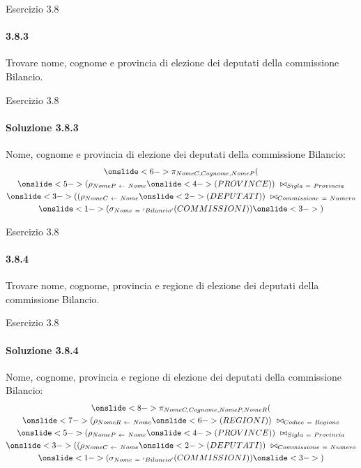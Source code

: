 %
\begin{frame}{Esercizio 3.8}
    \framesubtitle{3.8.3}
    Trovare nome, cognome e provincia di elezione dei deputati della commissione Bilancio.
\end{frame}
%
\begin{frame}{Esercizio 3.8}
    \framesubtitle{Soluzione 3.8.3}
    \vspace*{-1.2cm}
    {\small Nome, cognome e provincia di elezione dei deputati della commissione Bilancio:}
    \small
    \begin{gather*}
        \onslide<6->{\pi_{NomeC,Cognome,NomeP}(}\\
        \onslide<5->{(\rho_{NomeP~\leftarrow~Nome}}
        \onslide<4->{(PROVINCE))~\bowtie_{Sigla~=~Provincia}}\\
        \onslide<3->{((\rho_{NomeC~\leftarrow~Nome}}
        \onslide<2->{(DEPUTATI))~\bowtie_{Commissione~=~Numero}}\\
        \onslide<1->{(\sigma_{Nome~=~'Bilancio'}(COMMISSIONI))}
        \onslide<3->{)}
    \end{gather*}
\end{frame}
%
\begin{frame}{Esercizio 3.8}
    \framesubtitle{3.8.4}
    Trovare nome, cognome, provincia e regione di elezione dei deputati della commissione Bilancio.
\end{frame}
%
\begin{frame}{Esercizio 3.8}
    \framesubtitle{Soluzione 3.8.4}
    \vspace*{-1.2cm}
    {\small Nome, cognome, provincia e regione di elezione dei deputati della commissione Bilancio:}
    \small
    \begin{gather*}
        \onslide<8->{\pi_{NomeC,Cognome,NomeP,NomeR}(}\\
        \onslide<7->{(\rho_{NomeR~\leftarrow~Nome}}
        \onslide<6->{(REGIONI))~\bowtie_{Codice~=~Regione}}\\
        \onslide<5->{(\rho_{NomeP~\leftarrow~Nome}}
        \onslide<4->{(PROVINCE))~\bowtie_{Sigla~=~Provincia}}\\
        \onslide<3->{((\rho_{NomeC~\leftarrow~Nome}}
        \onslide<2->{(DEPUTATI))~\bowtie_{Commissione~=~Numero}}\\
        \onslide<1->{(\sigma_{Nome~=~'Bilancio'}(COMMISSIONI))}
        \onslide<3->{)}
    \end{gather*}
\end{frame}
%